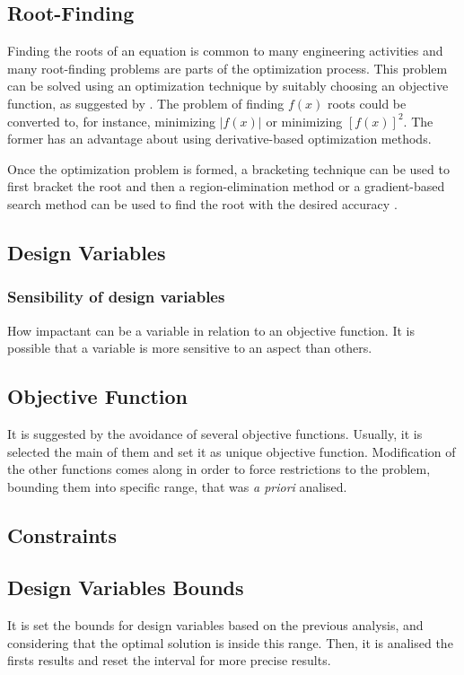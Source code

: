 \subsection{Root-Finding}
Finding the roots of an equation is common to many engineering activities and many root-finding problems are parts of the optimization process. This problem can be solved using an optimization technique by suitably choosing an objective function, as suggested by \cite{Deb2012}. The problem of finding $f(x)$ roots could be converted to, for instance, minimizing $\left|f(x)\right|$ or minimizing $\left[f(x)\right]^2$. The former has an advantage about using derivative-based optimization methods.

Once the optimization problem is formed, a bracketing technique can be used to first bracket the root and then a region-elimination method or a gradient-based search method can be used to find the root with the desired accuracy \cite{Deb2012}.


\subsection{Design Variables}
\subsubsection{Sensibility of design variables}
How impactant can be a variable in relation to an objective function. It is possible that a variable is more sensitive to an aspect than others.

\subsection{Objective Function}
It is suggested by \cite{Deb2012} the avoidance of several objective functions. Usually, it is selected the main of them and set it as unique objective function. Modification of the other functions comes along in order to force restrictions to the problem, bounding them into specific range, that was \textit{a priori} analised.

\subsection{Constraints}

\subsection{Design Variables Bounds}
It is set the bounds for design variables based on the previous analysis, and considering that the optimal solution is inside this range. Then, it is analised the firsts results and reset the interval for more precise results.

